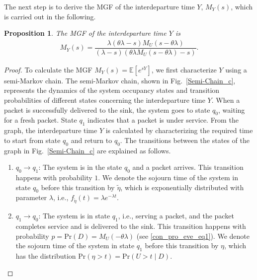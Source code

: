 \documentclass[conference]{IEEEtran}
\newtheorem{Pro}{Proposition}
\begin{document}
The next step is to derive the MGF of the interdeparture time $Y$, $M_{Y}(s)$, which is carried out in the following.
\begin{Pro}\label{Pro2}
The MGF of the  interdeparture time $Y$
is 
\begin{align}\label{mgfinterde1}
M_{Y}(s)=\dfrac{\lambda(\theta\lambda-s)M_U(s-\theta\lambda)}{(\lambda-s)(\theta\lambda M_U(s-\theta\lambda)-s)}.
\end{align}
\end{Pro}
\begin{proof}
To calculate the  MGF 
${{M}_{Y}(s)=\mathbb{E}[e^{sY}]}$, we first  characterize $Y$ using a semi-Markov chain. The semi-Markov chain, shown in Fig.~\ref{Semi-Chain_c}, represents the dynamics of the system occupancy states and transition probabilities of different states concerning the interdeparture time $Y$.
When a packet is successfully delivered to the sink, the system goes to state $q_0$, waiting for a fresh packet. State $q_{1}$ indicates that a packet is under service. From the graph, the interdeparture time $Y$ is calculated by characterizing the required time to start from state $q_0$ and return to $q_0$. 
The transitions between the states of the graph in Fig.~\ref{Semi-Chain_c} are explained as follows.


\begin{enumerate}
\item $ q_0\rightarrow q_{1}$: The system is in the state $q_0$ and a packet arrives. This transition happens with probability $1$. We denote the sojourn time of the system in state $q_0$ before this transition by $\tilde\eta$, which is exponentially distributed with parameter $\lambda$, i.e., $f_{\tilde\eta}(t)=\lambda e^{-\lambda t}$.


\item $q_1\rightarrow q_0$: The system is in state $q_1$, i.e., serving a packet, and the packet completes service and is delivered to the sink. This transition happens with probability ${p}=\mathrm{Pr}(D)=M_{U}(-\theta\lambda)$ (see \eqref{con_pro_eve_eq1}). We denote the sojourn time of the system in state $q_1$ before this transition by ${\eta}$, which has the distribution ${\mathrm{Pr}({\eta}>t)=\mathrm{Pr}(U>t\mid D)}$.



\end{enumerate}
\end{proof}
\end{document}
